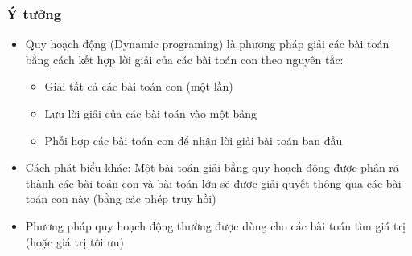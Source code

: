\subsubsection{Ý tưởng}
\begin{itemize}
    \item Quy hoạch động (Dynamic programing) là phương pháp giải các bài toán bằng cách kết hợp lời giải của các bài toán con theo nguyên tắc:
        \begin{itemize}
            \item Giải tất cả các bài toán con (một lần)
            \item Lưu lời giải của các bài toán vào một bảng
            \item Phối hợp các bài toán con để nhận lời giải bài toán ban đầu
        \end{itemize}
    \item Cách phát biểu khác: Một bài toán giải bằng quy hoạch động được phân rã thành các bài toán con và bài toán lớn sẽ được giải quyết thông qua các bài toán con này (bằng các phép truy hồi)
    \item Phương pháp quy hoạch động thường được dùng cho các bài toán tìm giá trị (hoặc giá trị tối ưu)
\end{itemize}

